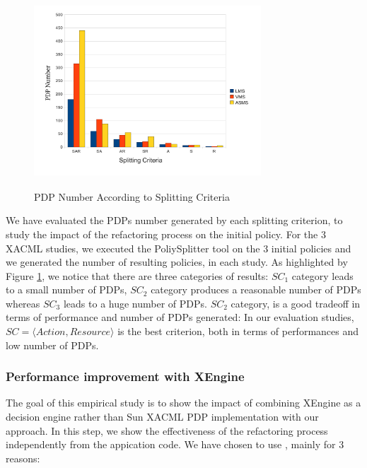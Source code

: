 \begin{figure}[!h]
  \centering
\includegraphics[width=8.5cm, height=7.2cm]{pdpnumber.pdf}
\begin{center}
\caption{PDP Number According to Splitting Criteria}
\label{pdpnumber}
\end{center}
\end{figure} 

We have evaluated the PDPs number generated by each splitting criterion, to study the impact of the refactoring process on the initial policy. 
For the 3 XACML studies, we executed the PoliySplitter tool on the 3 initial policies and we generated the number of resulting policies, in each study. 
As highlighted by Figure \ref{pdpnumber}, we notice that there are three
 categories of results: $SC_{1}$ category leads to a small number of PDPs, $SC_{2}$ category produces a reasonable number of PDPs whereas $SC_{3}$ leads to a huge 
number of PDPs. $SC_{2}$ category, is a good tradeoff in terms of performance and number of 
PDPs generated: In our evaluation studies, $SC=\langle Action, Resource\rangle$ is the best criterion, both in terms of performances and low number of PDPs.


\subsubsection{Performance improvement with XEngine}
The goal of this empirical study is to show the impact of combining XEngine as a decision engine rather than Sun XACML PDP implementation with our approach. 
In this step, we show the effectiveness of the refactoring process independently from the appication code.
We have chosen to use \cite{Xengine}, mainly for 3 reasons:

